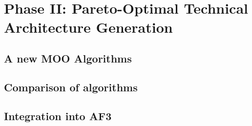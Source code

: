 \chapter{Phase II: Pareto-Optimal Technical Architecture Generation}\label{chapter:safeTAG}

\section{A new MOO Algorithms}

\section{Comparison of algorithms}

\section{Integration into AF3}